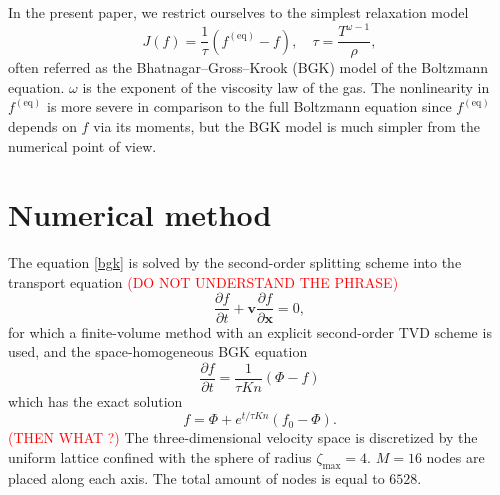 \documentclass[]{elsarticle} %
\newcommand{\equil}[1]{#1^\mathrm{(eq)}}
\begin{document}
{%
In the present paper, we restrict ourselves to the simplest relaxation model~\cite{Krook1954, Welander1954}
\begin{equation}\label{eq:bgk}
    J(f) = \frac1\tau\left(\equil{f}-f\right), \quad \tau = \frac{T^{\omega-1}}{\rho},
\end{equation}
often referred as the Bhatnagar--Gross--Krook (BGK) model of the Boltzmann equation.
\(\omega\) is the exponent of the viscosity law of the gas.
The nonlinearity in \(\equil{f}\) is more severe in comparison to the full Boltzmann equation
since \(\equil{f}\) depends on \(f\) via its moments,
but the BGK model is much simpler from the numerical point of view.

\section{Numerical method}\label{sec:numerics}

The equation \eqref{bgk} is solved by the second-order splitting scheme into the transport equation \textcolor{red}{(DO NOT UNDERSTAND  THE PHRASE)}
$$
\frac{\partial f}{\partial t}+\mathbf{v}\frac{\partial f}{\partial \mathbf{x}}=0,
$$
for which a finite-volume method with an explicit second-order TVD scheme is used, and the space-homogeneous BGK equation
$$
\frac{\partial f}{\partial t}=\frac{{1}}{\tau Kn}(\Phi-f)
$$
which has the exact solution
$$
f=\Phi+e^{t/\tau Kn}(f_0-\Phi).
$$
\textcolor{red}{(THEN WHAT ?)}
The three-dimensional velocity space is discretized by the uniform lattice confined with the sphere of radius \(\zeta_{\max}=4\).
\(M=16\) nodes are placed along each axis. The total amount of nodes is equal to \(6528\).

}
\end{document}

